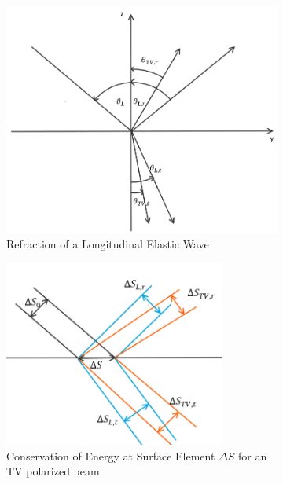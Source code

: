 \begin{figure}[h]
    \centering
    \begin{subfigure}{0.49\textwidth}
        \includegraphics[width=\textwidth]{pictures/L_wave_diffraction.png}
        \caption{Refraction of a Longitudinal Elastic Wave}
        \label{fig:refPwave}
    \end{subfigure}
    \begin{subfigure}{0.49\textwidth}
        \vspace{30pt}
        \includegraphics[width=0.8\textwidth]{pictures/energypartition.png}
        \vspace{20pt}
        \caption{Conservation of Energy at Surface Element $\Delta S$ for an TV
            polarized beam}
        \label{fig:energypartition}
    \end{subfigure}
    \caption{}
    \label{fig:angles}
\end{figure}

